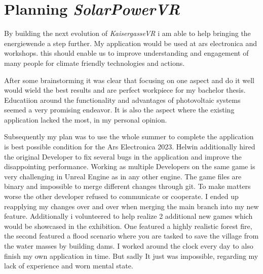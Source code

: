 \documentclass[draft, final]{vutinfth} %
\begin{document}
\section{Planning \textit{SolarPowerVR}}
By building the next evolution of \textit{KaisergasseVR} i am able to help bringing the energiewende a step further. My application would  be used at ars electronica and workshops. this should enable us to improve understanding and engagement of many people for climate friendly technologies and actions. 

After some brainstorming it was clear that focusing on one aspect and do it well would wield the best results and are perfect workpiece for my bachelor thesis. Educatiion around the functionality and advantages of photovoltaic systems seemed a very promising endeavor. It is also the aspect where the existing application lacked the most, in my personal opinion.


Subsequently my plan was to use the whole summer to complete the application is best possible condition for the Ars Electronica 2023. Helwin additionally hired the original Developer to fix several bugs in the application and improve the disappointing performance. Working as multiple Developers on the same game is very challenging in Unreal Engine as in any other engine. The game files are binary and impossible to merge different changes through git. To make matters worse the other developer refused to communicate or cooperate. I ended up reapplying my changes over and over when merging the main branch into my new feature. Additionally i volunteered to help realize 2 additional new games which would be showcased in the exhibition. One featured a highly realistic forest fire, the second featured a flood scenario where you are tasked to save the village from the water masses by building dams. I worked around the clock every day to also finish my own application in time. But sadly It just was impossible, regarding my lack of experience and worn mental state.
\end{document}

